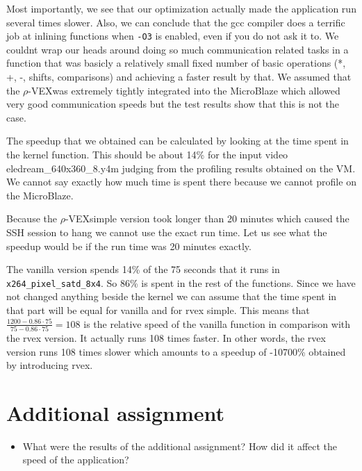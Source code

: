 \documentclass{article}
\newcommand{\rvex}{\ensuremath{\rho}-VEX}
\newcommand{\satd}{\texttt{x264\_pixel\_satd\_8x4}}
\begin{document}
Most importantly, we see that our optimization actually made the application
run several times slower.  Also, we can conclude that the gcc compiler does a
terrific job at inlining functions when \texttt{-O3} is enabled, even if you do
not ask it to.  We couldnt wrap our heads around doing so much communication
related tasks in a function that was basicly a relatively small fixed number of
basic operations (*, +, -, shifts, comparisons) and achieving a faster result
by that.  We assumed that the \rvex was extremely tightly integrated into the
MicroBlaze which allowed very good communication speeds but the test results
show that this is not the case.

The speedup that we obtained can be calculated by looking at the time spent in
the kernel function. This should be about 14\% for the input video
eledream\_640x360\_8.y4m judging from the profiling results obtained on the
VM\@. We cannot say exactly how much time is spent there because we cannot
profile on the MicroBlaze.

Because the \rvex simple version took longer than 20 minutes which caused the
SSH session to hang we cannot use the exact run time. Let us see what the
speedup would be if the run time was 20 minutes exactly.

The vanilla version spends 14\% of the 75 seconds that it runs in \satd{}. So
86\% is spent in the rest of the functions. Since we have not changed anything
beside the kernel we can assume that the time spent in that part will be equal
for vanilla and for rvex simple. This means that $\frac{1200 - 0.86\cdot75}{75 -
0.86\cdot75} = 108$ is the relative speed of the vanilla function in comparison
with the rvex version.  It actually runs 108 times faster.  In other words, the
rvex version runs 108 times slower which amounts to a speedup of -10700\%
obtained by introducing rvex.

\section{Additional assignment}

\begin{itemize}
  \item What were the results of the additional assignment? How did it affect
        the speed of the application?
\end{itemize}
\end{document}
